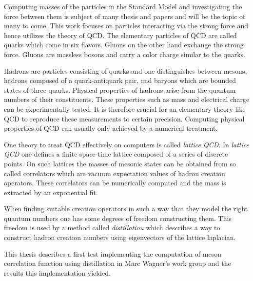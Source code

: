 Computing masses of the particles in the Standard Model and investigating the force between them is subject of many thesis and papers and will be the topic of many to come. This work focuses on particles interacting via the strong force and hence utilizes the theory of QCD. The elementary particles of QCD are called quarks which come in six flavors. Gluons on the other hand exchange the strong force. Gluons are massless bosons and carry a color charge similar to the quarks.

Hadrons are particles consisting of quarks and one distinguishes between mesons, hadrons composed of a quark-antiquark pair, and baryons which are bounded states of three quarks. Physical properties of hadrons arise from the quantum numbers of their constituents. These properties such as mass and electrical charge can be experimentally tested. It is therefore crucial for an elementary theory like QCD to reproduce these measurements to certain precision. Computing physical properties of QCD can usually only achieved by a numerical treatment.

One theory to treat QCD effectively on computers is called \textit{lattice QCD}. In \textit{lattice QCD} one defines a finite space-time lattice composed of a series of discrete points. On such lattices the masses of mesonic states can be obtained from so called correlators which are vacuum expectation values of hadron creation operators. These correlators can be numerically computed and the mass is extracted by an exponential fit.

When finding suitable creation operators in such a way that they model the right quantum numbers one has some degrees of freedom constructing them. This freedom is used by a method called \textit{distillation} which describes a way to construct hadron creation numbers using eigenvectors of the lattice laplacian.

This thesis describes a first test implementing the computation of meson correlation function using distillation in Marc Wagner's work group and the results this implementation yielded.